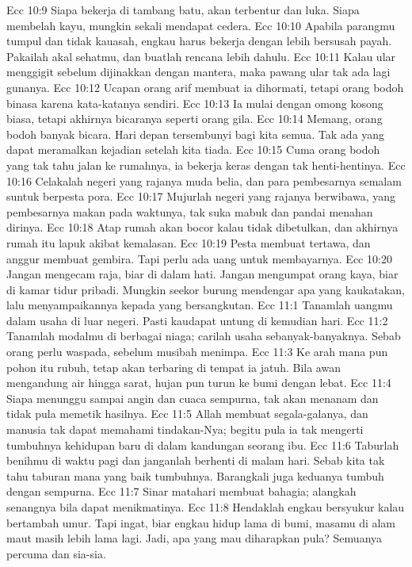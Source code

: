 Ecc 10:9  Siapa bekerja di tambang batu, akan terbentur dan luka. Siapa membelah kayu, mungkin sekali mendapat cedera.
Ecc 10:10  Apabila parangmu tumpul dan tidak kauasah, engkau harus bekerja dengan lebih bersusah payah. Pakailah akal sehatmu, dan buatlah rencana lebih dahulu.
Ecc 10:11  Kalau ular menggigit sebelum dijinakkan dengan mantera, maka pawang ular tak ada lagi gunanya.
Ecc 10:12  Ucapan orang arif membuat ia dihormati, tetapi orang bodoh binasa karena kata-katanya sendiri.
Ecc 10:13  Ia mulai dengan omong kosong biasa, tetapi akhirnya bicaranya seperti orang gila.
Ecc 10:14  Memang, orang bodoh banyak bicara. Hari depan tersembunyi bagi kita semua. Tak ada yang dapat meramalkan kejadian setelah kita tiada.
Ecc 10:15  Cuma orang bodoh yang tak tahu jalan ke rumahnya, ia bekerja keras dengan tak henti-hentinya.
Ecc 10:16  Celakalah negeri yang rajanya muda belia, dan para pembesarnya semalam suntuk berpesta pora.
Ecc 10:17  Mujurlah negeri yang rajanya berwibawa, yang pembesarnya makan pada waktunya, tak suka mabuk dan pandai menahan dirinya.
Ecc 10:18  Atap rumah akan bocor kalau tidak dibetulkan, dan akhirnya rumah itu lapuk akibat kemalasan.
Ecc 10:19  Pesta membuat tertawa, dan anggur membuat gembira. Tapi perlu ada uang untuk membayarnya.
Ecc 10:20  Jangan mengecam raja, biar di dalam hati. Jangan mengumpat orang kaya, biar di kamar tidur pribadi. Mungkin seekor burung mendengar apa yang kaukatakan, lalu menyampaikannya kepada yang bersangkutan.
Ecc 11:1  Tanamlah uangmu dalam usaha di luar negeri. Pasti kaudapat untung di kemudian hari.
Ecc 11:2  Tanamlah modalmu di berbagai niaga; carilah usaha sebanyak-banyaknya. Sebab orang perlu waspada, sebelum musibah menimpa.
Ecc 11:3  Ke arah mana pun pohon itu rubuh, tetap akan terbaring di tempat ia jatuh. Bila awan mengandung air hingga sarat, hujan pun turun ke bumi dengan lebat.
Ecc 11:4  Siapa menunggu sampai angin dan cuaca sempurna, tak akan menanam dan tidak pula memetik hasilnya.
Ecc 11:5  Allah membuat segala-galanya, dan manusia tak dapat memahami tindakan-Nya; begitu pula ia tak mengerti tumbuhnya kehidupan baru di dalam kandungan seorang ibu.
Ecc 11:6  Taburlah benihmu di waktu pagi dan janganlah berhenti di malam hari. Sebab kita tak tahu taburan mana yang baik tumbuhnya. Barangkali juga keduanya tumbuh dengan sempurna.
Ecc 11:7  Sinar matahari membuat bahagia; alangkah senangnya bila dapat menikmatinya.
Ecc 11:8  Hendaklah engkau bersyukur kalau bertambah umur. Tapi ingat, biar engkau hidup lama di bumi, masamu di alam maut masih lebih lama lagi. Jadi, apa yang mau diharapkan pula? Semuanya percuma dan sia-sia.
